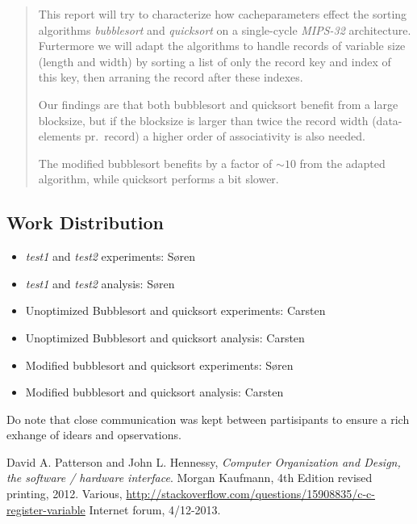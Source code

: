 



\begin{abstract}
This report will try to characterize how cacheparameters effect the sorting
algorithms \emph{bubblesort} and \emph{quicksort} on a single-cycle
\emph{MIPS-32} architecture.
Furtermore we will adapt the algorithms to handle records of variable size
(length and width) by sorting a list of only the record key and index of this
key, then arraning the record after these indexes.

Our findings are that both bubblesort and quicksort benefit from a large
blocksize, but if the blocksize is larger than twice the record width
(data-elements pr.\ record) a higher order of associativity is also needed.

The modified bubblesort benefits by a factor of $\sim10$ from the adapted
algorithm, while quicksort performs a bit slower.
\end{abstract}

\vspace{5cm}
\subsection*{Work Distribution}
\begin{itemize}
  \item \emph{test1} and \emph{test2} experiments: Søren
  \item \emph{test1} and \emph{test2} analysis: Søren
	 \item Unoptimized Bubblesort and quicksort experiments: Carsten
	 \item Unoptimized Bubblesort and quicksort analysis: Carsten
	\item Modified bubblesort and quicksort experiments: Søren
	\item Modified bubblesort and quicksort analysis: Carsten
\end{itemize}
Do note that close communication was kept between partisipants to ensure a rich
exhange of idears and opservations.

\newpage
\tableofcontents
\lstlistoflistings
\newpage







\begin{thebibliography}{9}

  David A. Patterson and John L. Hennessy,
  \emph{Computer Organization and Design, the software / hardware interface}.
  Morgan Kaufmann,
  4th Edition revised printing,
  2012.
  Various,
  \url{http://stackoverflow.com/questions/15908835/c-c-register-variable}
  Internet forum,
  4/12-2013.

\end{thebibliography}

